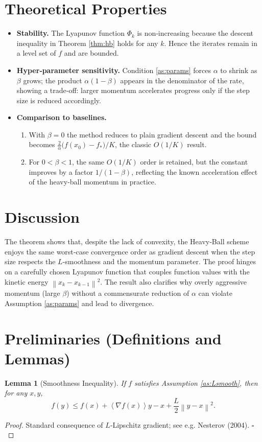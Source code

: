 \documentclass{article}
\newtheorem{lemma}{Lemma}
\newcommand{\norm}[1]{\left\lVert#1\right\rVert}
\newcommand{\inner}[1]{\left\langle#1\right\rangle}
\begin{document}
\section*{Theoretical Properties}
\begin{itemize}[leftmargin=*]
\item \textbf{Stability.} The Lyapunov function $\Phi_k$ is non‑increasing because the descent inequality in Theorem \ref{thm:hb} holds for any $k$. Hence the iterates remain in a level set of $f$ and are bounded.
\item \textbf{Hyper‑parameter sensitivity.} Condition \eqref{as:params} forces $\alpha$ to shrink as $\beta$ grows; the product $\alpha(1-\beta)$ appears in the denominator of the rate, showing a trade‑off: larger momentum accelerates progress only if the step size is reduced accordingly.
\item \textbf{Comparison to baselines.}
\begin{enumerate}
\item With $\beta=0$ the method reduces to plain gradient descent and the bound becomes $\frac{2}{\alpha}\bigl(f(x_0)-f_*\bigr)/K$, the classic $O(1/K)$ result.
\item For $0<\beta<1$, the same $O(1/K)$ order is retained, but the constant improves by a factor $1/(1-\beta)$, reflecting the known acceleration effect of the heavy‑ball momentum in practice.
\end{enumerate}
\end{itemize}

\section*{Discussion}
The theorem shows that, despite the lack of convexity, the Heavy‑Ball scheme enjoys the same worst‑case convergence order as gradient descent when the step size respects the $L$‑smoothness and the momentum parameter. The proof hinges on a carefully chosen Lyapunov function that couples function values with the kinetic energy $\norm{x_k-x_{k-1}}^2$. The result also clarifies why overly aggressive momentum (large $\beta$) without a commensurate reduction of $\alpha$ can violate Assumption \ref{as:params} and lead to divergence.

\newpage

\section*{Preliminaries (Definitions and Lemmas)}
\begin{lemma}[Smoothness Inequality]\label{lem:smooth}
If $f$ satisfies Assumption \ref{as:Lsmooth}, then for any $x,y$,
\[
f(y)\le f(x)+\inner{\nabla f(x)}{y-x}+\frac{L}{2}\norm{y-x}^2.
\]
\end{lemma}
\begin{proof}
Standard consequence of $L$‑Lipschitz gradient; see e.g. Nesterov (2004). \hfill $\square$
\end{proof}
\end{document}
